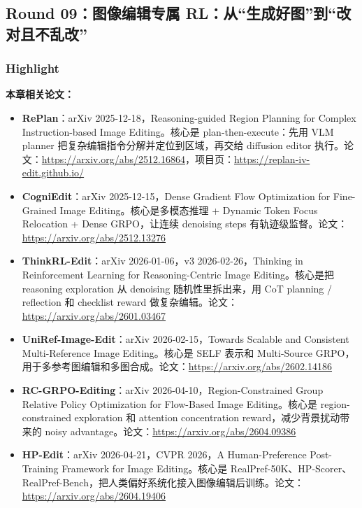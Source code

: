 
\subsection{Round 09：图像编辑专属 RL：从“生成好图”到“改对且不乱改”}

\subsubsection{Highlight}

\begin{conceptbox}
\textbf{本章相关论文：}
\begin{itemize}[leftmargin=1.5em]
  \item \textbf{RePlan}：arXiv 2025-12-18，Reasoning-guided Region Planning for Complex Instruction-based Image Editing。核心是 plan-then-execute：先用 VLM planner 把复杂编辑指令分解并定位到区域，再交给 diffusion editor 执行。论文：\url{https://arxiv.org/abs/2512.16864}，项目页：\url{https://replan-iv-edit.github.io/}
  \item \textbf{CogniEdit}：arXiv 2025-12-15，Dense Gradient Flow Optimization for Fine-Grained Image Editing。核心是多模态推理 + Dynamic Token Focus Relocation + Dense GRPO，让连续 denoising steps 有轨迹级监督。论文：\url{https://arxiv.org/abs/2512.13276}
  \item \textbf{ThinkRL-Edit}：arXiv 2026-01-06，v3 2026-02-26，Thinking in Reinforcement Learning for Reasoning-Centric Image Editing。核心是把 reasoning exploration 从 denoising 随机性里拆出来，用 CoT planning / reflection 和 checklist reward 做复杂编辑。论文：\url{https://arxiv.org/abs/2601.03467}
  \item \textbf{UniRef-Image-Edit}：arXiv 2026-02-15，Towards Scalable and Consistent Multi-Reference Image Editing。核心是 SELF 表示和 Multi-Source GRPO，用于多参考图编辑和多图合成。论文：\url{https://arxiv.org/abs/2602.14186}
  \item \textbf{RC-GRPO-Editing}：arXiv 2026-04-10，Region-Constrained Group Relative Policy Optimization for Flow-Based Image Editing。核心是 region-constrained exploration 和 attention concentration reward，减少背景扰动带来的 noisy advantage。论文：\url{https://arxiv.org/abs/2604.09386}
  \item \textbf{HP-Edit}：arXiv 2026-04-21，CVPR 2026，A Human-Preference Post-Training Framework for Image Editing。核心是 RealPref-50K、HP-Scorer、RealPref-Bench，把人类偏好系统化接入图像编辑后训练。论文：\url{https://arxiv.org/abs/2604.19406}
\end{itemize}
\end{conceptbox}

